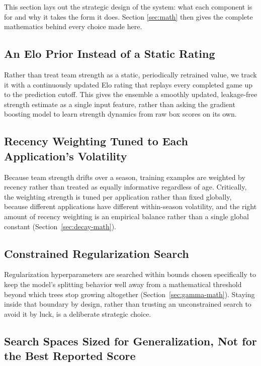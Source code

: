 \documentclass[conference]{IEEEtran}
\begin{document}
This section lays out the strategic design of the system: what each
component is for and why it takes the form it does. Section
\ref{sec:math} then gives the complete mathematics behind every choice
made here.

\subsection{An Elo Prior Instead of a Static Rating}

Rather than treat team strength as a static, periodically retrained
value, we track it with a continuously updated Elo rating that
replays every completed game up to the prediction cutoff. This gives
the ensemble a smoothly updated, leakage-free strength estimate as a
single input feature, rather than asking the gradient boosting model
to learn strength dynamics from raw box scores on its own.

\subsection{Recency Weighting Tuned to Each Application's Volatility}
\label{sec:decay-strategy}

Because team strength drifts over a season, training examples are
weighted by recency rather than treated as equally informative
regardless of age. Critically, the weighting strength is tuned per
application rather than fixed globally, because different applications
have different within-season volatility, and the right amount of
recency weighting is an empirical balance rather than a single global
constant (Section~\ref{sec:decay-math}).

\subsection{Constrained Regularization Search}
\label{sec:gamma-strategy}

Regularization hyperparameters are searched within bounds chosen
specifically to keep the model's splitting behavior well away from a
mathematical threshold beyond which trees stop growing altogether
(Section~\ref{sec:gamma-math}). Staying inside that boundary by design,
rather than trusting an unconstrained search to avoid it by luck, is a
deliberate strategic choice.

\subsection{Search Spaces Sized for Generalization, Not for the Best Reported Score}
\label{sec:search-strategy}
\end{document}
